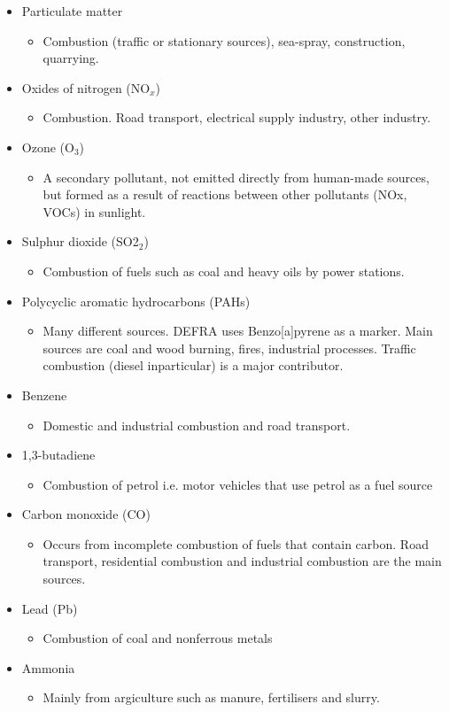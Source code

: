 \begin{itemize}
\item Particulate matter
\begin{itemize}
\item Combustion (traffic or stationary sources), sea-spray, construction, quarrying.
\end{itemize}
\item Oxides of nitrogen (NO$_{x}$)
\begin{itemize}
\item Combustion. Road transport, electrical supply industry, other industry.
\end{itemize}
\item Ozone (O$_{3}$)
\begin{itemize}
\item A secondary pollutant, not emitted directly from human-made sources, but formed as a result of reactions between other pollutants (NOx, VOCs) in sunlight.
\end{itemize}
\item Sulphur dioxide (SO2$_{2}$)
\begin{itemize}
\item Combustion of fuels such as coal and heavy oils by power stations.
\end{itemize}
\item Polycyclic aromatic hydrocarbons (PAHs) 
\begin{itemize}
\item Many different sources. DEFRA uses Benzo[a]pyrene as a marker. Main sources are coal and wood burning, fires, industrial processes. Traffic combustion (diesel inparticular) is a major contributor.
\end{itemize}
\item Benzene
\begin{itemize}
\item Domestic and industrial combustion and road transport.
\end{itemize}
\item 1,3-butadiene
\begin{itemize}
\item Combustion of petrol i.e. motor vehicles that use petrol as a fuel source
\end{itemize}
\item Carbon monoxide (CO)
\begin{itemize}
\item Occurs from incomplete combustion of fuels that contain carbon. Road transport, residential combustion and industrial combustion are the main sources.
\end{itemize}
\item Lead (Pb)
\begin{itemize}
\item Combustion of coal and nonferrous metals
\end{itemize}
\item Ammonia
\begin{itemize}
\item Mainly from argiculture such as manure, fertilisers and slurry.
\end{itemize}
\end{itemize}

